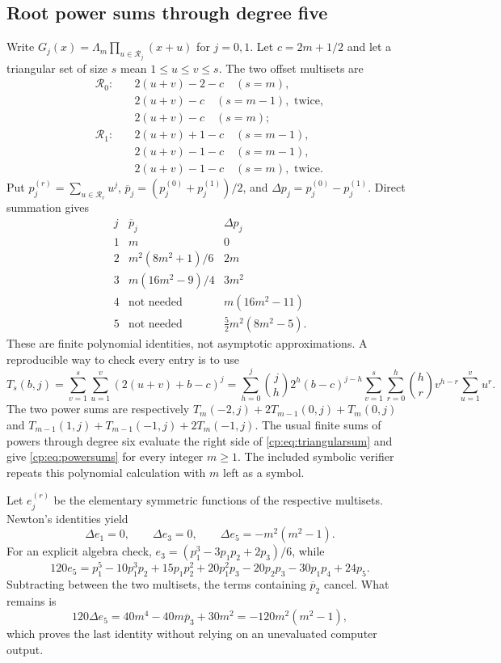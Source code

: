 \documentclass[11pt]{article}
\theoremstyle{definition}
\theoremstyle{remark}
\theoremstyle{definition}
\theoremstyle{plain}
\numberwithin{equation}{section}
\begin{document}
\subsection{Root power sums through degree five}
Write $G_j(x)=\Lambda_m\prod_{u\in\mathcal R_j}(x+u)$ for $j=0,1$.
Let $c=2m+1/2$ and let a triangular set of size $s$ mean
$1\le u\le v\le s$. The two offset multisets are
\begin{align*}
 \mathcal R_0:\quad&
 2(u+v)-2-c\quad(s=m),\\[-2pt]
 &2(u+v)-c\quad(s=m-1),\text{ twice},\\[-2pt]
 &2(u+v)-c\quad(s=m);\\[3pt]
 \mathcal R_1:\quad&
 2(u+v)+1-c\quad(s=m-1),\\[-2pt]
 &2(u+v)-1-c\quad(s=m-1),\\[-2pt]
 &2(u+v)-1-c\quad(s=m),\text{ twice}.
\end{align*}
Put $p_j^{(r)}=\sum_{u\in\mathcal R_r}u^j$,
$\overline p_j=(p_j^{(0)}+p_j^{(1)})/2$, and
$\Delta p_j=p_j^{(0)}-p_j^{(1)}$. Direct summation gives
\begin{equation}
\begin{array}{c|c|c}
 j&\overline p_j&\Delta p_j\\ \hline
 1&m&0\\
 2& m^2(8m^2+1)/6&2m\\
 3& m(16m^2-9)/4&3m^2\\
 4&\text{not needed}&m(16m^2-11)\\
 5&\text{not needed}&\frac52m^2(8m^2-5).
\end{array}
 \label{cp:eq:powersums}
\end{equation}
These are finite polynomial identities, not asymptotic approximations.
A reproducible way to check every entry is to use
\begin{equation}
 T_s(b,j)=\sum_{v=1}^s\sum_{u=1}^v
       (2(u+v)+b-c)^j
 =\sum_{h=0}^j\binom jh2^h(b-c)^{j-h}
   \sum_{v=1}^s\sum_{r=0}^h\binom hr v^{h-r}\sum_{u=1}^v u^r.
 \label{cp:eq:triangularsum}
\end{equation}
The two power sums are respectively
$T_m(-2,j)+2T_{m-1}(0,j)+T_m(0,j)$ and
$T_{m-1}(1,j)+T_{m-1}(-1,j)+2T_m(-1,j)$.
The usual finite sums of powers through degree six evaluate the right side
of \eqref{cp:eq:triangularsum} and give \eqref{cp:eq:powersums} for every integer
$m\ge1$. The included symbolic verifier repeats this polynomial calculation
with $m$ left as a symbol.

Let $e_j^{(r)}$ be the elementary symmetric functions of the respective
multisets. Newton's identities yield
\begin{equation}
 \Delta e_1=0,\qquad \Delta e_3=0,\qquad
 \boxed{\Delta e_5=-m^2(m^2-1).}
 \label{cp:eq:elementarydifferences}
\end{equation}
For an explicit algebra check, $e_3=(p_1^3-3p_1p_2+2p_3)/6$, while
\[
 120e_5=p_1^5-10p_1^3p_2+15p_1p_2^2+20p_1^2p_3
        -20p_2p_3-30p_1p_4+24p_5.
\]
Subtracting between the two multisets, the terms containing
$\overline p_2$ cancel. What remains is
\[
 120\Delta e_5=40m^4-40m\overline p_3+30m^2
             =-120m^2(m^2-1),
\]
which proves the last identity without relying on an unevaluated computer
output.
\end{document}
